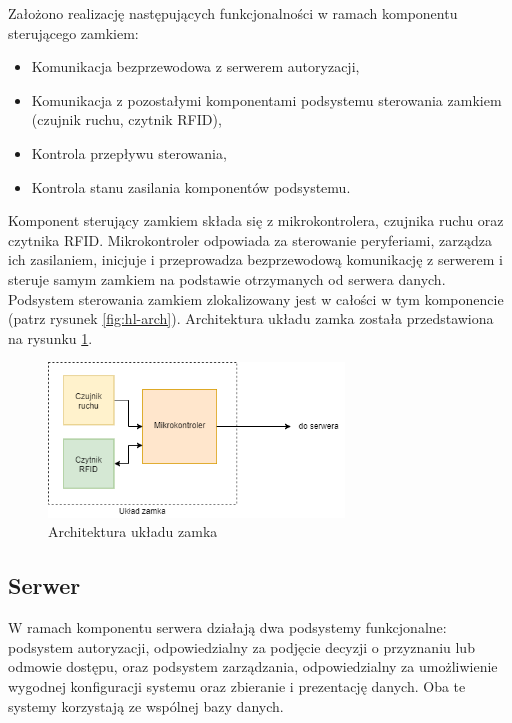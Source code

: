                         Założono realizację następujących funkcjonalności w ramach komponentu sterującego zamkiem:
                        \begin{itemize}
                            \item Komunikacja bezprzewodowa z serwerem autoryzacji,
                            \item Komunikacja z pozostałymi komponentami podsystemu sterowania zamkiem (czujnik ruchu, czytnik RFID),
                            \item Kontrola przepływu sterowania,
                            \item Kontrola stanu zasilania komponentów podsystemu.
                        \end{itemize}

                        Komponent sterujący zamkiem składa się z mikrokontrolera, czujnika ruchu oraz czytnika RFID. Mikrokontroler odpowiada za sterowanie peryferiami, zarządza ich zasilaniem, inicjuje i przeprowadza bezprzewodową komunikację z serwerem i steruje samym zamkiem na podstawie otrzymanych od serwera danych. Podsystem sterowania zamkiem zlokalizowany jest w całości w tym komponencie (patrz rysunek \ref{fig:hl-arch}). Architektura układu zamka została przedstawiona na rysunku \ref{fig:lock-arch}.

                        \begin{figure}
                                \centering
                                \includegraphics[width=0.7\textwidth]{chapters/images/lock.png}
                                \caption{Architektura układu zamka}
                                \label{fig:lock-arch}
                        \end{figure}

                \subsection{Serwer}
                        W ramach komponentu serwera działają dwa podsystemy funkcjonalne: podsystem autoryzacji, odpowiedzialny za podjęcie decyzji o przyznaniu lub odmowie dostępu, oraz podsystem zarządzania, odpowiedzialny za umożliwienie wygodnej konfiguracji systemu oraz zbieranie i prezentację danych. Oba te systemy korzystają ze wspólnej bazy danych.


